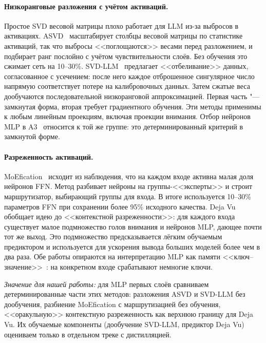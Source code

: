 \paragraph{Низкоранговые разложения с учётом активаций.}
Простое SVD весовой матрицы плохо работает для LLM из-за выбросов в
активациях. ASVD~\cite{yuan2023asvd} масштабирует столбцы весовой
матрицы по статистике активаций, так что выбросы <<поглощаются>> весами
перед разложением, и подбирает ранг послойно с учётом
чувствительности слоёв. Без обучения это сжимает сеть на 10--30\%.
SVD-LLM~\cite{wang2025svdllm} предлагает <<отбеливание>> данных,
согласованное с усечением: после него каждое отброшенное сингулярное
число напрямую соответствует потере на калибровочных данных. Затем
сжатые веса дообучаются последовательной низкоранговой
аппроксимацией. Первая часть "--- замкнутая форма, вторая требует
градиентного обучения. Эти методы применимы к любым линейным
проекциям, включая проекции внимания. Отбор нейронов MLP в
A3~\cite{wong2025a3} относится к той же группе: это детерминированный
критерий в замкнутой форме.

\paragraph{Разреженность активаций.}
MoEfication~\cite{zhang2022moefication} исходит из наблюдения, что на
каждом входе активна малая доля нейронов FFN. Метод разбивает нейроны
на группы-<<эксперты>> и строит маршрутизатор, выбирающий группы для
входа. В итоге используется 10--30\% параметров FFN при сохранении
более 95\% исходного качества. Deja Vu~\cite{liu2023dejavu} обобщает
идею до <<контекстной разреженности>>: для каждого входа существует
малое подмножество голов внимания и нейронов MLP, дающее почти тот же
выход. Это подмножество предсказывается лёгким обучаемым предиктором
и используется для ускорения вывода больших моделей более чем в два раза.
Обе работы опираются на интерпретацию MLP как памяти
<<ключ--значение>>~\cite{geva2021ffn}: на конкретном входе срабатывают
немногие ключи.

\emph{Значение для нашей работы:} для MLP первых слоёв сравниваем
детерминированные части этих методов: разложения ASVD и SVD-LLM без
дообучения, разбиение MoEfication с маршрутизацией без обучения,
<<оракульную>> контекстную разреженность как верхнюю границу для Deja
Vu. Их обучаемые компоненты (дообучение SVD-LLM, предиктор Deja Vu)
оцениваем только в отдельном треке с дистилляцией.


